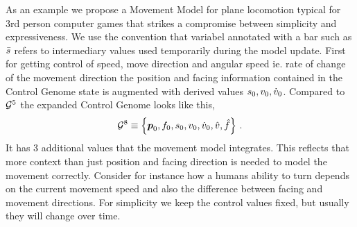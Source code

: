As an example we propose a Movement Model for plane locomotion typical for 3rd person computer games   that strikes a compromise between simplicity and expressiveness. We use the convention that variabel annotated with a bar such as $\bar{s}$ refers to intermediary values used temporarily during the model update. 
%
First for getting control of speed, move direction and angular speed ie. rate of change of the movement direction the position and facing information contained in the Control Genome state is augmented with derived values $s_0, v_0, {\dot{v}}_0$. 
%
Compared to $\mathcal{G}^{5}$ the expanded Control Genome looks like this,
\begin{subequations}
\begin{align}
    \mathcal{G}^{8} \equiv \left\{ \boldsymbol{p }_0,f_0,s_0,v_0,{\dot{v}}_0,\hat{v},\hat{f} \right\}\,.
\end{align}
\end{subequations}
It has 3 additional values that the movement model integrates. This reflects that more context than just position and facing direction is needed to model the movement correctly. Consider for instance how a humans ability to turn depends on the current movement speed and also the difference between facing and movement directions. For simplicity we keep the control values fixed, but usually they will change over time.

